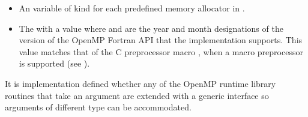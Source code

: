 \begin{fortranspecific}
\begin{itemize}
\item An   variable of kind  for each predefined memory allocator in .

\item The    with a value  where 
and  are the year and month designations of the version of the OpenMP Fortran
API that the implementation supports. This value matches that of the C preprocessor
macro , when a macro preprocessor is supported (see
).
\end{itemize}


It is implementation defined whether any of the OpenMP runtime library routines that
take an argument are extended with a generic interface so arguments of different 
type can be accommodated. 
\end{fortranspecific}







